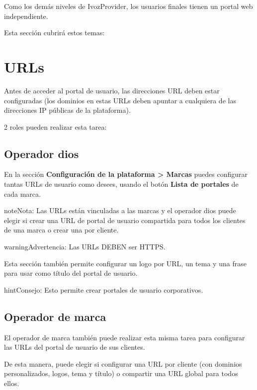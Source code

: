 \documentclass[letterpaper,10pt,spanish]{sphinxmanual}
\begin{document}
Como los demás niveles de IvozProvider, los usuarios finales tienen un portal web independiente.

Esta sección cubrirá estos temas:


\section{URLs}
\label{user_portal/urls::doc}\label{user_portal/urls:urls}
Antes de acceder al portal de usuario, las direcciones URL deben estar configuradas (los dominios en estas URLs deben apuntar a cualquiera de las direcciones IP públicas de la plataforma).

2 roles pueden realizar esta tarea:


\subsection{Operador dios}
\label{user_portal/urls:god-operator}
En la sección \textbf{Configuración de la plataforma \textgreater{} Marcas} puedes configurar tantas URLs de usuario como desees, usando el botón \textbf{Lista de portales} de cada marca.

\begin{notice}{note}{Nota:}
Las URLs están vinculadas a las marcas y el operador dios puede elegir si crear una URL de portal de usuario compartida para todos los clientes de una marca o crear una por cliente.
\end{notice}

\begin{notice}{warning}{Advertencia:}
Las URLs DEBEN ser HTTPS.
\end{notice}

Esta sección también permite configurar un logo por URL, un tema y una frase para usar como título del portal de usuario.

\begin{notice}{hint}{Consejo:}
Esto permite crear portales de usuario corporativos.
\end{notice}


\subsection{Operador de marca}
\label{user_portal/urls:brand-operator}
El operador de marca también puede realizar esta misma tarea para configurar las URLs del portal de usuario de sus clientes.

De esta manera, puede elegir si configurar una URL por cliente (con dominios personalizados, logos, tema y título) o compartir una URL global para todos ellos.
\end{document}
